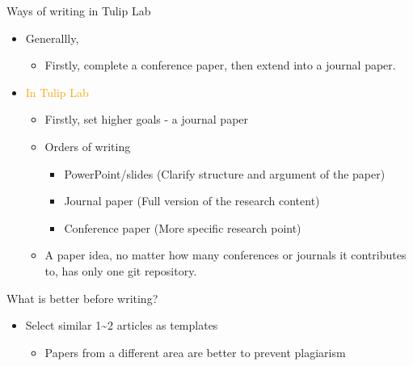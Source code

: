 \documentclass[
 size=14pt,
 paper=smartboard,  %
 mode=present, 		%
 display=slides, 	%
 style=tuliplab,  	%
 pauseslide,
 fleqn,leqno]{powerdot}{}
\begin{document}

\begin{slide}[toc=,bm=]{Ways of writing in Tulip Lab}
	\begin{itemize}
		\item Generallly, 
			\begin{itemize}
				\item Firstly, complete a conference paper, then extend into a journal paper.
			\end{itemize}
		\item \textcolor{orange}{In Tulip Lab}
			\begin{itemize}
				\item Firstly, set higher goals - a journal paper
				\item Orders of writing
					\begin{itemize}
						\item PowerPoint/slides (Clarify structure and argument of the paper)
						\item Journal paper (Full version of the research content)
						\item Conference paper (More specific research point)
					\end{itemize}
				\item A paper idea, no matter how many conferences or journals it contributes to, has only one git repository.
			\end{itemize}
	\end{itemize}	
\end{slide}


\begin{slide}[toc=,bm=]{What is better before writing?}
	\begin{itemize}
		\item Select similar 1\~{}2 articles as templates 
			\begin{itemize}
				\item Papers from a different area are better to prevent plagiarism
			\end{itemize}	
	\end{itemize}	
\end{slide}


\end{document}
